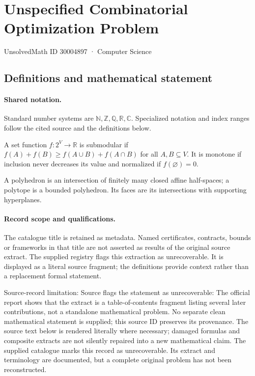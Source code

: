 \documentclass[11pt]{article}
\begin{document}
\setcounter{section}{30004896}
\section{Unspecified Combinatorial Optimization Problem}\label{30004897}
{\small\sffamily UnsolvedMath ID 30004897 · Computer Science}
\subsection{Definitions and mathematical statement}

\paragraph{Shared notation.}Standard number systems are $\mathbb N,\mathbb Z,\mathbb Q,\mathbb R,\mathbb C$. Specialized notation and index ranges follow the cited source and the definitions below.


A set function $f:2^V\to\mathbb R$ is submodular if $f(A)+f(B)\geq f(A\cup B)+f(A\cap B)$ for all $A,B\subseteq V$. It is monotone if inclusion never decreases its value and normalized if $f(\varnothing)=0$.

A polyhedron is an intersection of finitely many closed affine half-spaces; a polytope is a bounded polyhedron. Its faces are its intersections with supporting hyperplanes.
\paragraph{Record scope and qualifications.}
The catalogue title is retained as metadata. Named certificates, contracts, bounds or frameworks in that title are not asserted as results of the original source extract.
The supplied registry flags this extraction as unrecoverable. It is displayed as a literal source fragment; the definitions provide context rather than a replacement formal statement.

Source-record limitation: Source flags the statement as unrecoverable: The official report shows that the extract is a table-of-contents fragment listing several later contributions, not a standalone mathematical problem. No separate clean mathematical statement is supplied; this source ID preserves its provenance.
The source text below is rendered literally where necessary; damaged formulas and composite extracts are not silently repaired into a new mathematical claim.
The supplied catalogue marks this record as unrecoverable. Its extract and terminology are documented, but a complete original problem has not been reconstructed.
\end{document}
